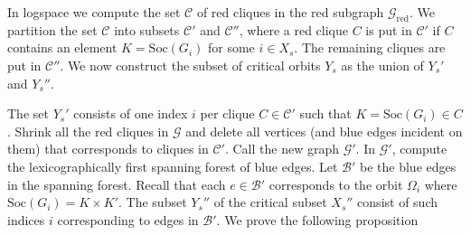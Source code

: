 \documentclass[11pt]{madras}%
\theoremstyle{remark}
\newcommand{\Soc}[1]{{\ensuremath{\mathrm{Soc}\left(#1\right)}}}
\begin{document}
In logspace we compute the set $\mathcal{C}$ of red cliques in the red
subgraph $\mathcal{G}_{\mathrm{red}}$.  We partition the set
$\mathcal{C}$ into subsets $\mathcal{C}'$ and $\mathcal{C}''$, where a
red clique $C$ is put in $\mathcal{C}'$ if $C$ contains an element
$K=\Soc{G_i}$ for some $i \in X_s$. The remaining cliques are put in
$\mathcal{C}''$.  We now construct the subset of critical orbits $Y_s$
as the union of $Y_s'$ and $Y_s''$.

The set $Y_s'$ consists of one index $i$ per clique $C \in
\mathcal{C}'$ such that $K = \Soc{G_i} \in C$.  Shrink all the red
cliques in $\mathcal{G}$ and delete all vertices (and blue edges
incident on them) that corresponds to cliques in $\mathcal{C}'$.  Call
the new graph $\mathcal{G}'$. In $\mathcal{G}'$, compute the
lexicographically first spanning forest of blue edges.  Let
$\mathcal{B}'$ be the blue edges in the spanning forest.  Recall that
each $e\in \mathcal{B}'$ corresponds to the orbit $\Omega_i$ where
$\Soc{G_i}=K\times K'$. The subset $Y_s''$ of the critical subset
$X_s''$ consist of such indices $i$ corresponding to edges in
$\mathcal{B}'$.  We prove the following proposition
\end{document}
